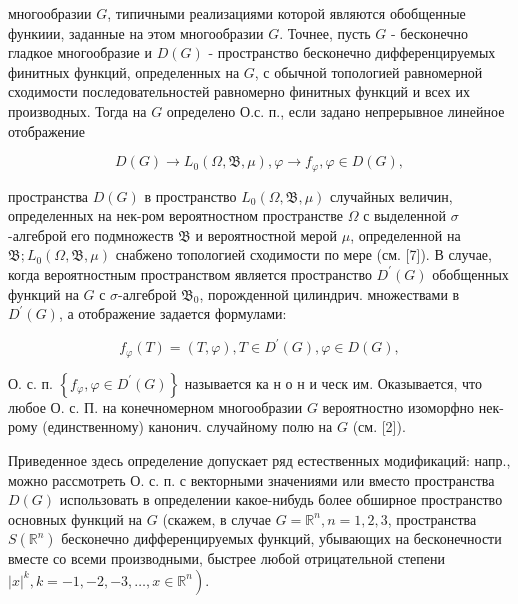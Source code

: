 \documentclass[10pt]{article}
\begin{document}
многообразии $G$, типичными реализациями которой являются обобщенные функиии, заданные на этом многообразии $G$. Точнее, пусть $G$ - бесконечно гладкое многообразие и $D(G)$ - пространство бесконечно дифференцируемых финитных функций, определенных на $G$, с обычной топологией равномерной сходимости последовательностей равномерно финитных функций и всех их производных. Тогда на $G$ определено О.с. п., если задано непрерывное линейное отображение



\[

D(G) \rightarrow L_{0}(\Omega, \mathfrak{B}, \mu), \varphi \rightarrow f_{\varphi}, \varphi \in D(G),

\]



пространства $D(G)$ в пространство $L_{0}(\Omega, \mathfrak{B}, \mu)$ случайных величин, определенных на нек-ром вероятностном пространстве $\Omega$ с выделенной $\sigma$-алгеброй его подмножеств $\mathfrak{B}$ и вероятностной мерой $\mu$, определенной на $\mathfrak{B} ; L_{0}(\Omega, \mathfrak{B}, \mu)$ снабжено топологией сходимости по мере (см. [7]). В случае, когда вероятностным пространством является пространство $D^{\prime}(G)$ обобщенных функций на $G$ с $\sigma$-алгеброй $\mathfrak{B}_{0}$, порожденной цилиндрич. множествами в $D^{\prime}(G)$, а отображение задается формулами:



\[

f_{\varphi}(T)=(T, \varphi), T \in D^{\prime}(G), \varphi \in D(G),

\]



О. с. п. $\left\{f_{\varphi}, \varphi \in D^{\prime}(G)\right\}$ называется ка н о н и ческ им. Оказывается, что любое О. с. П. на конечномерном многообразии $G$ вероятностно изоморфно нек-рому (единственному) канонич. случайному полю на $G$ (см. [2]).



Приведенное здесь определение допускает ряд естественных модификаций: напр., можно рассмотреть О. с. п. с векторными значениями или вместо пространства $D(G)$ использовать в определении какое-нибудь более обширное пространство основных функций на $G$ (скажем, в случае $G=\mathbb{R}^{n}, n=1,2,3$, пространства $S\left(\mathbb{R}^{n}\right)$ бесконечно дифференцируемых функций, убывающих на бесконечности вместе со всеми производными, быстрее любой отрицательной степени $\left.|x|^{k}, k=-1,-2,-3, \ldots, x \in \mathbb{R}^{n}\right)$.
\end{document}
